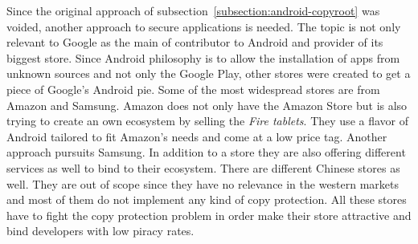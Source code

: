 Since the original approach of subsection~\ref{subsection:android-copyroot} was voided, another approach to secure applications is needed.
The topic is not only relevant to Google as the main of contributor to Android and provider of its biggest store.
Since Android philosophy is to allow the installation of apps from unknown sources and not only the Google Play, other stores were created to get a piece of Google's Android pie.
Some of the most widespread stores are from Amazon and Samsung.
Amazon does not only have the Amazon Store but is also trying to create an own ecosystem by selling the \textit{Fire tablets}.
They use a flavor of Android tailored to fit Amazon's needs and come at a low price tag.
Another approach pursuits Samsung.
In addition to a store they are also offering different services as well to bind to their ecosystem.
There are different Chinese stores as well.
They are out of scope since they have no relevance in the western markets and most of them do not implement any kind of copy protection.
\newline
All these stores have to fight the copy protection problem in order make their store attractive and bind developers with low piracy rates.
